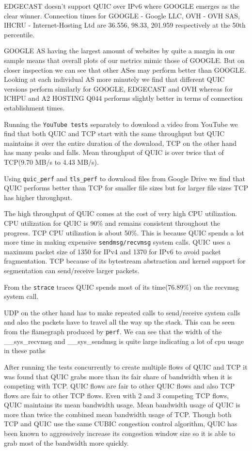 \begin{frame}[allowframebreaks]
EDGECAST doesn't support QUIC over IPv6 where GOOGLE emerges as the clear winner. Connection times for GOOGLE - Google LLC, OVH - OVH SAS, IHCRU - Internet-Hosting Ltd are 36.556, 98.33, 201.959 respectively at the 50th percentile.

GOOGLE AS having the largest amount of websites by quite a margin in our sample means that overall plots of our metrics mimic those of GOOGLE. But on closer inspection we can see that other ASes may perform better than GOOGLE. Looking at each individual AS more minutely we find that different QUIC versions perform similarly for GOOGLE, EDGECAST and OVH whereas for ICHPU and A2 HOSTING Q044 performs slightly better in terms of connection establishment times.

Running the \texttt{YouTube tests} separately to download a video from YouTube we find that both QUIC and TCP start  with the same throughput but QUIC maintains it over the entire duration of the download, TCP on the other hand has many peaks and falls. Mean throughput of QUIC is over twice that of TCP(9.70 MB/s to 4.43 MB/s).

Using \texttt{quic\_perf} and \texttt{tls\_perf} to download files from Google Drive we find that QUIC performs better than TCP for smaller file sizes but for larger file sizes TCP has higher throughput.

The high throughput of QUIC comes at the cost of very high CPU utilization. CPU utilization for QUIC is 90\% and remains consistent throughout the progress. TCP CPU utilization is about 50\%.
This is because QUIC spends a lot more time in making expensive \texttt{sendmsg/recvmsg} system calls. QUIC uses a maximum packet size of 1350 for IPv4 and 1370 for IPv6 to avoid packet fragmentation. TCP because of its bytestream abstraction and kernel support for segmentation can send/receive larger packets.

From the \texttt{strace} traces QUIC spends most of its time(76.89\%) on the recvmsg system call. 

UDP on the other hand has to make repeated calls to send/receive system calls and also the packets have to travel all the way up the stack. This can be seen from the flamegraph produced by \texttt{perf}. We can see that the width of the \_\_sys\_recvmsg and \_\_sys\_sendmsg is quite large indicating a lot of cpu usage in these paths

After running the tests concurrently to create multiple flows of QUIC and TCP it was found that QUIC grabs more than its fair share of bandwidth when it is competing with TCP. QUIC flows are fair to other QUIC flows and also TCP flows are fair to other TCP flows. Even with 2 and 3 competing TCP flows, QUIC maintains its mean bandwidth usage.
Mean bandwidth usage of QUIC is more than twice the combined mean bandwidth usage of TCP. Though both TCP and QUIC use the same CUBIC congestion control algorithm, QUIC has been known to aggressively increase its congestion window size so it is able to grab most of the bandwidth more quickly. 

\end{frame}
\clearpage


